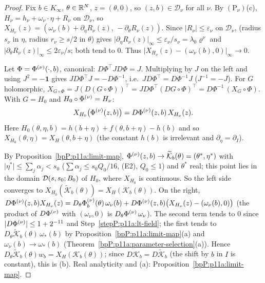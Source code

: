 \begin{proof}
\label{stepP:p11a:lt-field} Fix $b\in K_\infty$, $\theta\in\mathbb{R}^N$, $z=(\theta,0)$, so $(z,b)\in\mathcal D_\nu$ for all $\nu$. By $(\mathrm P_\nu)$(c), $H_\nu=h_\nu+\omega_\nu\cdot\eta+R_\nu$ on $\mathcal D_\nu$, so $X_{H_\nu}(z)=(\omega_\nu(b)+\partial_\eta R_\nu(z),\,-\partial_\theta R_\nu(z))$. Since $\lvert R_\nu\rvert\le\varepsilon_\nu$ on $\mathcal D_\nu$,  (radius $s_\nu$ in $\eta$, radius $r_\nu\ge s/2$ in $\theta$) gives $\lvert\partial_\eta R_\nu(z)\rvert_\infty\le\varepsilon_\nu/s_\nu=\lambda_0\varrho^\nu$ and $\lvert\partial_\theta R_\nu(z)\rvert_\infty\le2\varepsilon_\nu/s$; both tend to $0$. Thus $\lvert X_{H_\nu}(z)-(\omega_\nu(b),0)\rvert_\infty\to0$.

\label{stepP:p11a:lt-cov} Let $\Phi=\Phi^{(\nu)}(\cdot,b)$, canonical: $D\Phi^{\top}JD\Phi=J$. Multiplying by $J$ on the left and using $J^2=-\mathbf 1$ gives $JD\Phi^{\top}J=-D\Phi^{-1}$, i.e.\ $JD\Phi^{\top}=D\Phi^{-1}J$ ($J^{-1}=-J$). For $G$ holomorphic, $X_{G\circ\Phi}=J(D(G\circ\Phi))^{\top}=JD\Phi^{\top}(DG\circ\Phi)^{\top}=D\Phi^{-1}\,(X_G\circ\Phi)$. With $G=H_0$ and $H_0\circ\Phi^{(\nu)}=H_\nu$:
\[X_{H_0}\bigl(\Phi^{(\nu)}(z,b)\bigr)=D\Phi^{(\nu)}(z,b)\,X_{H_\nu}(z).\]
Here $H_0(\theta,\eta,b)=h(b+\eta)+f(\theta,b+\eta)-h(b)$ and so $X_{H_0}(\theta,\eta)=X_H(\theta,b+\eta)$ (the constant $h(b)$ is irrelevant and $\partial_\eta=\partial_I$).

\label{stepP:p11a:lt-lim} By Proposition~\ref{bpP:p11a:limit-map}, $\Phi^{(\nu)}(z,b)\to\widetilde{\mathcal K}_b(\theta)=(\theta^*,\eta^*)$ with $\lvert\eta^*\rvert\le\sum_j\alpha_j<s_0$ ($\sum\alpha_j\le s_0Q_0/16$, (E2), $Q_0\le1$) and $\theta^*$ real; this point lies in the domain $\mathcal D(s,s_0;B_0)$ of $H_0$, where $X_{H_0}$ is continuous. So the left side converges to $X_{H_0}(\widetilde{\mathcal K}_b(\theta))=X_H(\mathcal K_b(\theta))$. On the right, $D\Phi^{(\nu)}(z,b)X_{H_\nu}(z)=D_\theta\Phi^{(\nu)}_b(\theta)\,\omega_\nu(b)+D\Phi^{(\nu)}(z,b)\bigl(X_{H_\nu}(z)-(\omega_\nu(b),0)\bigr)$ (the product of $D\Phi^{(\nu)}$ with $(\omega_\nu,0)$ is $D_\theta\Phi^{(\nu)}\,\omega_\nu$). The second term tends to $0$ since $\lvert D\Phi^{(\nu)}\rvert\le1+2^{-11}$ and Step~\ref{stepP:p11a:lt-field}; the first tends to $D_\theta\widetilde{\mathcal K}_b(\theta)\,\omega_*(b)$ by Proposition~\ref{bpP:p11a:limit-map}(a) and $\omega_\nu(b)\to\omega_*(b)$ (Theorem~\ref{bpP:p11a:parameter-selection}(a)). Hence $D_\theta\widetilde{\mathcal K}_b(\theta)w_b=X_H(\mathcal K_b(\theta))$; since $D\mathcal K_b=D\widetilde{\mathcal K}_b$ (the shift by $b$ in $I$ is constant), this is (b). Real analyticity and (a): Proposition~\ref{bpP:p11a:limit-map}.


\end{proof}
